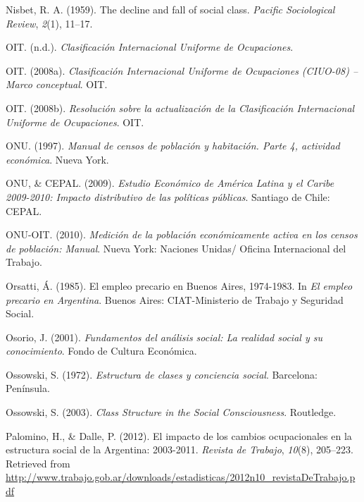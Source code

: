 \documentclass[
]{article}
\newlength{\cslhangindent}
\newlength{\cslentryspacingunit} %
\newenvironment{CSLReferences}[2] %
 {%
  \setlength{\parindent}{0pt}
  \ifodd #1
  \let\oldpar\par
  \def\par{\hangindent=\cslhangindent\oldpar}
  \fi
  \setlength{\parskip}{#2\cslentryspacingunit}
 }%
 {}
\begin{document}
\begin{CSLReferences}{1}{0}
\leavevmode{}%
Nisbet, R. A. (1959). The decline and fall of social class. \emph{Pacific Sociological Review}, \emph{2}(1), 11--17.

\leavevmode{}%
OIT. (n.d.). \emph{Clasificación {Internacional} {Uniforme} de {Ocupaciones}}.

\leavevmode{}%
OIT. (2008a). \emph{Clasificación {Internacional} {Uniforme} de {Ocupaciones} ({CIUO}-08) -- {Marco} conceptual}. OIT.

\leavevmode{}%
OIT. (2008b). \emph{Resolución sobre la actualización de la {Clasificación} {Internacional} {Uniforme} de {Ocupaciones}}. OIT.

\leavevmode{}%
ONU. (1997). \emph{Manual de censos de población y habitación. {Parte} 4, actividad económica}. Nueva York.

\leavevmode{}%
ONU, \& CEPAL. (2009). \emph{Estudio {Económico} de {América} {Latina} y el {Caribe} 2009-2010: Impacto distributivo de las políticas públicas}. Santiago de Chile: CEPAL.

\leavevmode{}%
ONU-OIT. (2010). \emph{Medición de la población económicamente activa en los censos de población: {Manual}}. Nueva York: Naciones Unidas/ Oficina Internacional del Trabajo.

\leavevmode{}%
Orsatti, Á. (1985). El empleo precario en {Buenos} {Aires}, 1974-1983. In \emph{El empleo precario en {Argentina}}. Buenos Aires: CIAT-Ministerio de Trabajo y Seguridad Social.

\leavevmode{}%
Osorio, J. (2001). \emph{Fundamentos del análisis social: La realidad social y su conocimiento}. Fondo de Cultura Económica.

\leavevmode{}%
Ossowski, S. (1972). \emph{Estructura de clases y conciencia social}. Barcelona: Península.

\leavevmode{}%
Ossowski, S. (2003). \emph{Class {Structure} in the {Social} {Consciousness}}. Routledge.

\leavevmode{}%
Palomino, H., \& Dalle, P. (2012). El impacto de los cambios ocupacionales en la estructura social de la {Argentina}: 2003-2011. \emph{Revista de Trabajo}, \emph{10}(8), 205--223. Retrieved from \url{http://www.trabajo.gob.ar/downloads/estadisticas/2012n10_revistaDeTrabajo.pdf}


\end{CSLReferences}
\end{document}
